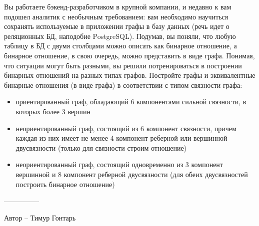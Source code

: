 \question
Вы работаете бэкенд-разработчиком в крупной компании, и недавно к вам подошел аналитик с необычным требованием: вам необходимо научиться сохранять используемые в приложении графы в базу данных (речь идет о реляционных БД, наподобие PostgreSQL). Подумав, вы поняли, что любую таблицу в БД с двумя столбцами можно описать как бинарное отношение, а бинарное отношение, в свою очередь, можно представить в виде графа. Понимая, что ситуации могут быть разными, вы решили потренироваться в построении бинарных отношений на разных типах графов. Постройте графы и эквивалентные бинарные отношения (в виде графа) в соответствии с типом связности графа:

\begin{itemize}
\item ориентированный граф, обладающий 6 компонентами сильной связности, в которых более 3 вершин
\item неориентированный граф, состоящий из 6 компонент связности, причем каждая из них имеет не менее 4 компонент реберной или вершинной двусвязности (только для связности строим отношение)
\item неориентированный граф, состоящий одновременно из 3 компонент вершинной и 8 компонент реберной двусвязности (для обеих двусвязностей построить бинарное отношение)
\end{itemize}

---------------

Автор -- Тимур Гонтарь